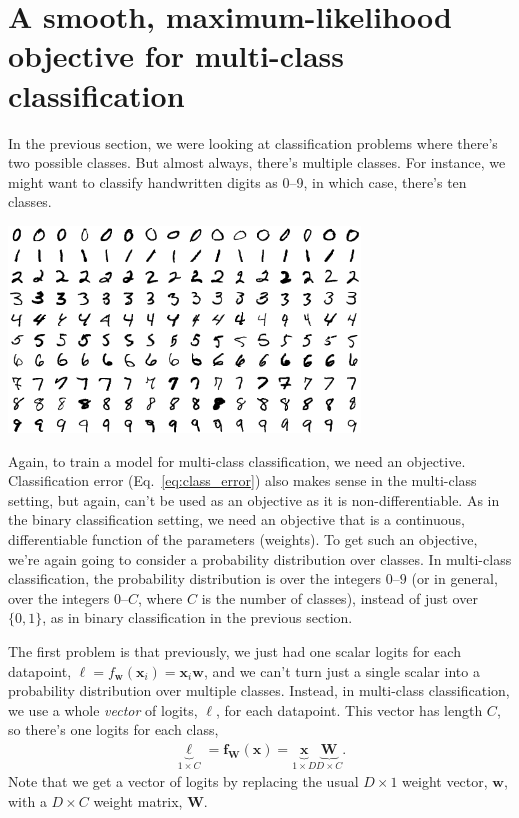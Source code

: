\documentclass{article}
\newcommand{\x}{\mathbf{x}}
\newcommand{\f}{\mathbf{f}}
\newcommand{\W}{\mathbf{W}}
\newcommand{\w}{\mathbf{w}}
\newcommand{\logits}{\ell}
\newcommand{\vlogits}{\boldsymbol{\logits}}
\begin{document}
\section{A smooth, maximum-likelihood objective for multi-class classification}
\label{sec:multi_obj}
In the previous section, we were looking at classification problems where there's two possible classes.
But almost always, there's multiple classes.
For instance, we might want to classify handwritten digits as 0--9, in which case, there's ten classes.
\begin{center}
\includegraphics[width=0.7\textwidth]{mnist}
\end{center}
Again, to train a model for multi-class classification, we need an objective.
Classification error (Eq.~\ref{eq:class_error}) also makes sense in the multi-class setting, but again, can't be used as an objective as it is non-differentiable.
As in the binary classification setting, we need an objective that is a continuous, differentiable function of the parameters (weights).
To get such an objective, we're again going to consider a probability distribution over classes.
In multi-class classification, the probability distribution is over the integers $0$--$9$ (or in general, over the integers $0$--$C$, where $C$ is the number of classes), instead of just over $\{0, 1\}$, as in binary classification in the previous section.

The first problem is that previously, we just had one scalar logits for each datapoint, $\logits = f_\w(\x_i) = \x_i \w$, and we can't turn just a single scalar into a probability distribution over multiple classes.
Instead, in multi-class classification, we use a whole \textit{vector} of logits, $\vlogits$, for each datapoint.
This vector has length $C$, so there's one logits for each class,
\begin{align}
  \underbrace{\vlogits}_{1 \times C} = \f_{\W}(\x) = \underbrace{\x}_{1 \times D} \underbrace{\W}_{D \times C}.
\end{align}
Note that we get a vector of logits by replacing the usual $D \times 1$ weight vector, $\w$, with a $D\times C$ weight matrix, $\W$.
\end{document}
